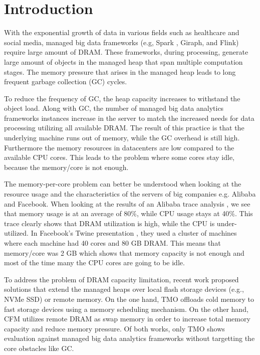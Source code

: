 \section{Introduction}
\label{sec:intro}

With the exponential growth of data in various fields such as
healthcare and social media, managed big data frameworks (e.g, Spark \cite{Spark},
Giraph, and Flink) require large amount of DRAM. 
These frameworks, during processing, generate large amount of objects
in the managed heap that span multiple computation stages.
The memory pressure that arises in the managed heap leads to long frequent garbage
collection (GC) cycles.

To reduce the frequency of GC, the heap capacity increases to withstand the object load.
Along with GC, the number of managed big data analytics frameworks instances increase
in the server to match the increased needs for data processing utilizing all available DRAM. The result of this practice
is that the underlying machine runs out of memory, while the GC overhead is still high. 
Furthermore the memory resources in datacenters are low compared to the available CPU cores.
This leads to the problem where some cores stay idle, because the memory/core is not enough.

The memory-per-core problem can better be understood when looking at the
resource usage and the characteristics of the servers of big companies e.g. Alibaba and Facebook.
When looking at the results of an Alibaba trace analysis \cite{Alibaba}, we see that memory usage
is at an average of 80\%, while CPU usage stays at 40\%. This trace clearly shows that DRAM utilization
is high, while the CPU is under-utilized. In Facebook's Twine presentation \cite{Twine},
they used a cluster of machines where each machine had 40 cores and 80 GB DRAM. This
means that memory/core was 2 GB which shows that memory capacity is not enough and most of the time many
the CPU cores are going to be idle.

To address the problem of DRAM capacity limitation, recent work
proposed solutions that extend the managed heaps over local flash
storage devices (e.g., NVMe SSD) or remote memory. On the one hand,
TMO \cite{TMO} offloads cold memory to fast storage devices using
a memory scheduling mechanism. On the other hand, CFM \cite{CFM}
utilizes remote DRAM as swap memory in order to increase total memory capacity
and reduce memory pressure. Of both works, only TMO shows
evaluation against managed big data analytics frameworks without
targetting the core obstacles like GC.

